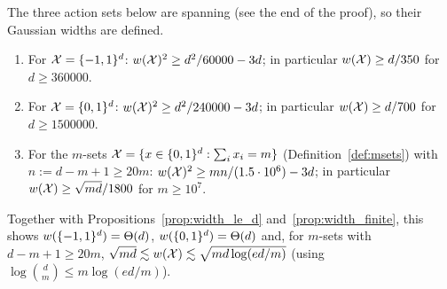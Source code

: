 \begin{corollary}\label{cor:width_structured}
The three action sets below are spanning (see the end of the proof), so their Gaussian
widths are defined.
\begin{enumerate}
  \item[(i)] For $\mathcal{X} = \{-1,1\}^d$: $w(\mathcal{X})^2 \ge d^2/60000 - 3d$; in particular
        $w(\mathcal{X}) \ge d/350$ for $d \ge 360000$.
  \item[(ii)] For $\mathcal{X} = \{0,1\}^d$: $w(\mathcal{X})^2 \ge d^2/240000 - 3d$; in particular
        $w(\mathcal{X}) \ge d/700$ for $d \ge 1500000$.
  \item[(iii)] For the $m$-sets $\mathcal{X} = \{x \in \{0,1\}^d : \sum_i x_i = m\}$
        (Definition~\ref{def:msets}) with $n := d - m + 1 \ge 20m$:
        $w(\mathcal{X})^2 \ge mn/(1.5\cdot 10^6) - 3d$; in particular
        $w(\mathcal{X}) \ge \sqrt{md}/1800$ for $m \ge 10^7$.
\end{enumerate}
Together with Propositions~\ref{prop:width_le_d} and~\ref{prop:width_finite}, this shows
$w(\{-1,1\}^d) = \Theta(d)$, $w(\{0,1\}^d) = \Theta(d)$ and, for $m$-sets with
$d - m + 1 \ge 20m$, $\sqrt{md} \lesssim w(\mathcal{X}) \lesssim \sqrt{md\log(ed/m)}$
(using $\log\binom{d}{m} \le m\log(ed/m)$).
\end{corollary}

